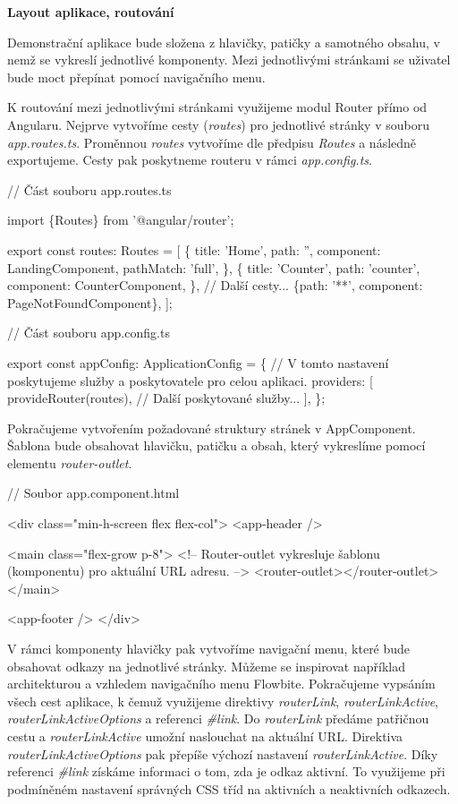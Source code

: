 \begin{flushleft}
  \textbf{Layout aplikace, routování}
\end{flushleft}

Demonstrační aplikace bude složena z hlavičky, patičky a samotného obsahu, v nemž se vykreslí jednotlivé komponenty. 
Mezi jednotlivými stránkami se uživatel bude moct přepínat pomocí navigačního menu.

K routování mezi jednotlivými stránkami využijeme modul Router přímo od Angularu. Nejprve vytvoříme cesty (\emph{routes}) pro jednotlivé stránky v souboru \emph{app.routes.ts}. 
Proměnnou \emph{routes} vytvoříme dle předpisu \emph{Routes} a následně exportujeme. Cesty pak poskytneme routeru v rámci \emph{app.config.ts}.

\begin{prog}
// Část souboru app.routes.ts

import \{Routes\} from '@angular/router';

export const routes: Routes = [
  \{
    title: 'Home',
    path: '',
    component: LandingComponent,
    pathMatch: 'full',
  \},
  \{
    title: 'Counter',
    path: 'counter',
    component: CounterComponent,
  \},
  // Další cesty...
  \{path: '**', component: PageNotFoundComponent\},
];

// Část souboru app.config.ts

export const appConfig: ApplicationConfig = \{
  // V tomto nastavení poskytujeme služby a poskytovatele pro celou aplikaci.
  providers: [
    provideRouter(routes),
    // Další poskytované služby...
  ],
\};
\end{prog}

Pokračujeme vytvořením požadované struktury stránek v AppComponent. Šablona bude obsahovat hlavičku, patičku a obsah, který vykreslíme pomocí elementu \emph{router-outlet}. 

\begin{prog}
// Soubor app.component.html

<div class="min-h-screen flex flex-col">
  <app-header />

  <main class="flex-grow p-8">
    <!-- Router-outlet vykresluje šablonu (komponentu) pro aktuální URL adresu. -->
    <router-outlet></router-outlet>
  </main>

  <app-footer />
</div>
\end{prog}

V rámci komponenty hlavičky pak vytvoříme navigační menu, které bude obsahovat odkazy na jednotlivé stránky. 
Můžeme se inspirovat například architekturou a vzhledem navigačního menu Flowbite. 
Pokračujeme vypsáním všech cest aplikace, k čemuž využijeme direktivy \emph{routerLink}, \emph{routerLinkActive}, \emph{routerLinkActiveOptions} a referenci \emph{\#link}. 
Do \emph{routerLink} předáme patřičnou cestu a \emph{routerLinkActive} umožní naslouchat na aktuální URL. Direktiva \emph{routerLinkActiveOptions} pak přepíše výchozí nastavení \emph{routerLinkActive}.
Díky referenci \emph{\#link} získáme informaci o tom, zda je odkaz aktivní. To využijeme při podmíněném nastavení správných CSS tříd na aktivních a neaktivních odkazech.

